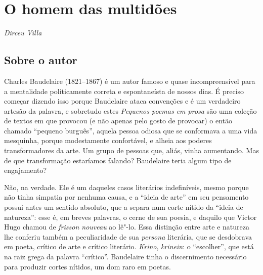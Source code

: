 \chapter*{O homem das multidões}

\begin{flushright}
\emph{Dirceu Villa}
\end{flushright}


\section{Sobre o autor}

Charles Baudelaire (1821--1867) é um autor famoso e quase
incompreensível para a mentalidade politicamente correta e
espontaneísta de nossos dias. É preciso começar dizendo isso porque
Baudelaire ataca convenções e é um verdadeiro artesão da palavra, e
sobretudo estes \textit{Pequenos poemas em prosa} são uma coleção de
textos em que provocou (e não apenas pelo gosto de provocar) o então
chamado “pequeno burguês”, aquela pessoa odiosa que se conformava a uma
vida mesquinha, porque modestamente confortável, e alheia aos poderes
transformadores da arte. Um grupo de pessoas que, aliás, vinha
aumentando. Mas de que transformação estaríamos falando? Baudelaire
teria algum tipo de engajamento?

Não, na verdade. Ele é um daqueles casos literários indefiníveis, mesmo
porque não tinha simpatia por nenhuma causa, e a “ideia de arte”
em seu pensamento possui antes um sentido absoluto, que a separa num
corte nítido da “ideia de natureza”: esse é, em breves palavras,
o cerne de sua poesia, e daquilo que Victor Hugo chamou de \textit{frisson
nouveau} ao lê"-lo. Essa distinção entre arte e natureza lhe
conferiu também a peculiaridade de sua \textit{persona} literária, que
se desdobrava em poeta, crítico de arte e crítico literário. \textit{Krino},
\textit{krinein}: o “escolher”, que está na raiz grega da palavra
 “crítico”. Baudelaire tinha o discernimento necessário para
produzir cortes nítidos, um dom raro em poetas.

